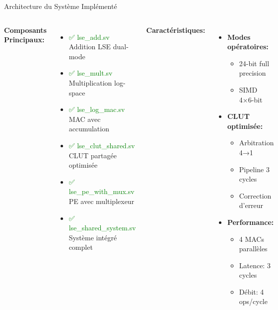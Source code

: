 \documentclass[aspectratio=169]{beamer}
\begin{document}
\begin{frame}{Architecture du Système Implémenté}
\begin{columns}
\textbf{Composants Principaux:}
\begin{itemize}
\item \textcolor{green}{✅ lse\_add.sv} \\
  \small{Addition LSE dual-mode}
\item \textcolor{green}{✅ lse\_mult.sv} \\
  \small{Multiplication log-space}
\item \textcolor{green}{✅ lse\_log\_mac.sv} \\
  \small{MAC avec accumulation}
\item \textcolor{green}{✅ lse\_clut\_shared.sv} \\
  \small{CLUT partagée optimisée}
\item \textcolor{green}{✅ lse\_pe\_with\_mux.sv} \\
  \small{PE avec multiplexeur}
\item \textcolor{green}{✅ lse\_shared\_system.sv} \\
  \small{Système intégré complet}
\end{itemize}

\textbf{Caractéristiques:}
\begin{itemize}
\item \textbf{Modes opératoires:}
  \begin{itemize}
  \item 24-bit full precision
  \item SIMD 4×6-bit
  \end{itemize}
\item \textbf{CLUT optimisée:}
  \begin{itemize}
  \item Arbitration 4→1
  \item Pipeline 3 cycles
  \item Correction d'erreur
  \end{itemize}
\item \textbf{Performance:}
  \begin{itemize}
  \item 4 MACs parallèles
  \item Latence: 3 cycles
  \item Débit: 4 ops/cycle
  \end{itemize}
\end{itemize}
\end{columns}
\end{frame}
\end{document}
